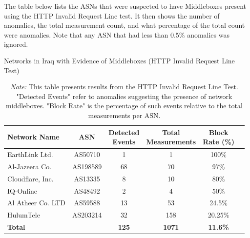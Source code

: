 The table below lists the ASNs that were suspected to have Middleboxes present using the HTTP Invalid Request Line test. It then shows the number of anomalies, the total measurement count, and what percentage of the total count were anomalies. Note that any ASN that had less than 0.5\% anomalies was ignored.

\vspace{2em}

\begin{table}[H]
\centering
\caption{Networks in Iraq with Evidence of Middleboxes (HTTP Invalid Request Line Test)}
\begin{tabular}{lccccc}
\toprule
\textbf{Network Name} & \textbf{ASN} & \shortstack{\textbf{Detected} \\ \textbf{Events}} & \shortstack{\textbf{Total} \\ \textbf{Measurements}} & \shortstack{\textbf{Block} \\ \textbf{Rate (\%)}} \\
\midrule
EarthLink Ltd.        & AS50710   & 1  & 1   & 100\%    \\
Al-Jazeera Co.        & AS198589  & 68 & 70  & 97\%     \\
Cloudflare, Inc.      & AS13335   & 8  & 10  & 80\%     \\
IQ-Online             & AS48492   & 2  & 4   & 50\%     \\
Al Atheer Co. LTD     & AS59588   & 13 & 53  & 24.5\%   \\
HulumTele             & AS203214  & 32 & 158 & 20.25\%  \\
\bottomrule
\textbf{Total} & & \textbf{125} & \textbf{1071} & \textbf{11.6\%} \\
\end{tabular}

\vspace{1em}

\caption*{\textit{Note:} This table presents results from the HTTP Invalid Request Line Test. "Detected Events" refer to anomalies suggesting the presence of network middleboxes. "Block Rate" is the percentage of such events relative to the total measurements per ASN.}
\label{tab:middlebox_http_invalid}
\end{table}


